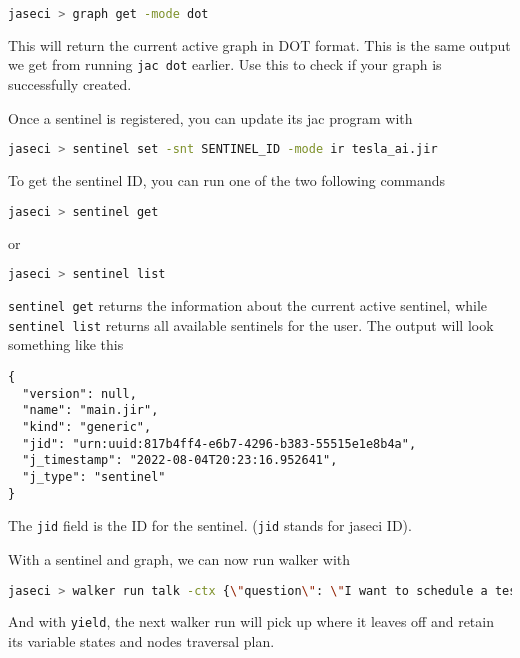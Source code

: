\begin{lstlisting}[language=bash]
jaseci > graph get -mode dot
\end{lstlisting}

This will return the current active graph in DOT format. This is the
same output we get from running \passthrough{\lstinline!jac dot!}
earlier. Use this to check if your graph is successfully created.

Once a sentinel is registered, you can update its jac program with

\begin{lstlisting}[language=bash]
jaseci > sentinel set -snt SENTINEL_ID -mode ir tesla_ai.jir
\end{lstlisting}

To get the sentinel ID, you can run one of the two following commands

\begin{lstlisting}[language=bash]
jaseci > sentinel get
\end{lstlisting}

or

\begin{lstlisting}[language=bash]
jaseci > sentinel list
\end{lstlisting}

\passthrough{\lstinline!sentinel get!} returns the information about the
current active sentinel, while \passthrough{\lstinline!sentinel list!}
returns all available sentinels for the user. The output will look
something like this

\begin{lstlisting}
{
  "version": null,
  "name": "main.jir",
  "kind": "generic",
  "jid": "urn:uuid:817b4ff4-e6b7-4296-b383-55515e1e8b4a",
  "j_timestamp": "2022-08-04T20:23:16.952641",
  "j_type": "sentinel"
}
\end{lstlisting}

The \passthrough{\lstinline!jid!} field is the ID for the sentinel.
(\passthrough{\lstinline!jid!} stands for jaseci ID).

With a sentinel and graph, we can now run walker with

\begin{lstlisting}[language=bash]
jaseci > walker run talk -ctx {\"question\": \"I want to schedule a test drive\"}
\end{lstlisting}

And with \passthrough{\lstinline!yield!}, the next walker run will pick
up where it leaves off and retain its variable states and nodes
traversal plan.

